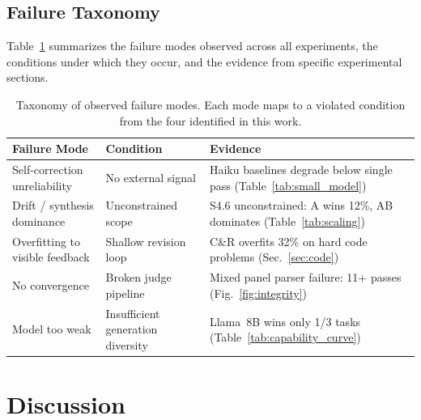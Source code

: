 \documentclass[11pt]{article}
\begin{document}
\subsection{Failure Taxonomy}

Table~\ref{tab:failures} summarizes the failure modes observed across all experiments, the conditions under which they occur, and the evidence from specific experimental sections.

\begin{table}[H]
\centering
\small
\begin{tabular}{@{}p{4cm}p{4cm}p{6cm}@{}}
\toprule
\textbf{Failure Mode} & \textbf{Condition} & \textbf{Evidence} \\
\midrule
\rowcolor{TableShade}
Self-correction unreliability & No external signal & Haiku baselines degrade below single pass (Table~\ref{tab:small_model}) \\
Drift / synthesis dominance & Unconstrained scope & S4.6 unconstrained: A wins 12\%, AB dominates (Table~\ref{tab:scaling}) \\
\rowcolor{TableShade}
Overfitting to visible feedback & Shallow revision loop & C\&R overfits 32\% on hard code problems (Sec.~\ref{sec:code}) \\
No convergence & Broken judge pipeline & Mixed panel parser failure: 11+ passes (Fig.~\ref{fig:integrity}) \\
\rowcolor{TableShade}
Model too weak & Insufficient generation diversity & Llama~8B wins only 1/3 tasks (Table~\ref{tab:capability_curve}) \\
\bottomrule
\end{tabular}
\caption{Taxonomy of observed failure modes. Each mode maps to a violated condition from the four identified in this work.}
\label{tab:failures}
\end{table}

\section{Discussion}
\end{document}
